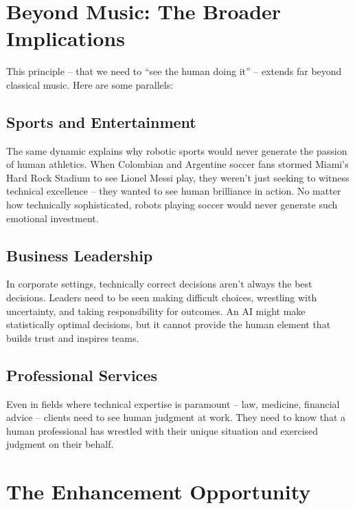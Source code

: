 \documentclass[
  Letterpaper,
]{scrbook}
\begin{document}
\section{Beyond Music: The Broader
Implications}\label{beyond-music-the-broader-implications}

This principle -- that we need to ``see the human doing it'' -- extends
far beyond classical music. Here are some parallels:

\subsection{Sports and Entertainment}\label{sports-and-entertainment}

The same dynamic explains why robotic sports would never generate the
passion of human athletics. When Colombian and Argentine soccer fans
stormed Miami's Hard Rock Stadium to see Lionel Messi play, they weren't
just seeking to witness technical excellence -- they wanted to see human
brilliance in action. No matter how technically sophisticated, robots
playing soccer would never generate such emotional investment.

\subsection{Business Leadership}\label{business-leadership}

In corporate settings, technically correct decisions aren't always the
best decisions. Leaders need to be seen making difficult choices,
wrestling with uncertainty, and taking responsibility for outcomes. An
AI might make statistically optimal decisions, but it cannot provide the
human element that builds trust and inspires teams.

\subsection{Professional Services}\label{professional-services}

Even in fields where technical expertise is paramount -- law, medicine,
financial advice -- clients need to see human judgment at work. They
need to know that a human professional has wrestled with their unique
situation and exercised judgment on their behalf.

\section{The Enhancement Opportunity}\label{the-enhancement-opportunity}
\end{document}
